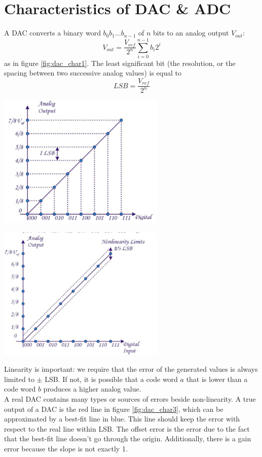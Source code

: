 \section{Characteristics of DAC \& ADC}
A DAC converts a binary word $b_0 b_1 \ldots b_{n-1}$ of $n$ bits to an analog output $V_{out}$:
$$
V_{out} = \frac{V_{ref}}{2^n} \sum_{i=0}^{n-1} b_i 2^i
$$
as in figure \ref{fig:dac_char1}. The least significant bit (the resolution, or the spacing between two successive analog values) is equal to 
$$
LSB = \frac{V_{ref}}{2^n}
$$
\begin{minipage}{.5\textwidth}
	\centering
	\includegraphics[width=8cm]{figures/ch18/dac_char1.jpg}
	\label{fig:dac_char1}
\end{minipage}%
\begin{minipage}{.5\textwidth}
	\centering
	\includegraphics[width=8cm]{figures/ch18/dac_char2.jpg}
	\label{fig:dac_char2}
\end{minipage}
Linearity is important: we require that the error of the generated values is always limited to $\pm$  LSB. If not, it is possible that a code word $a$ that is lower than a code word $b$ produces a higher analog value. \\
A real DAC contains many types or sources of errors beside non-linearity. A true output of a DAC is the red line in figure \ref{fig:dac_char3}, which can be approximated by a best-fit line in blue. This line should keep the error with respect to the real line within  LSB. The offset error is the error due to the fact that the best-fit line doesn't go through the origin. Additionally, there is a gain error because the slope is not exactly 1.\\
